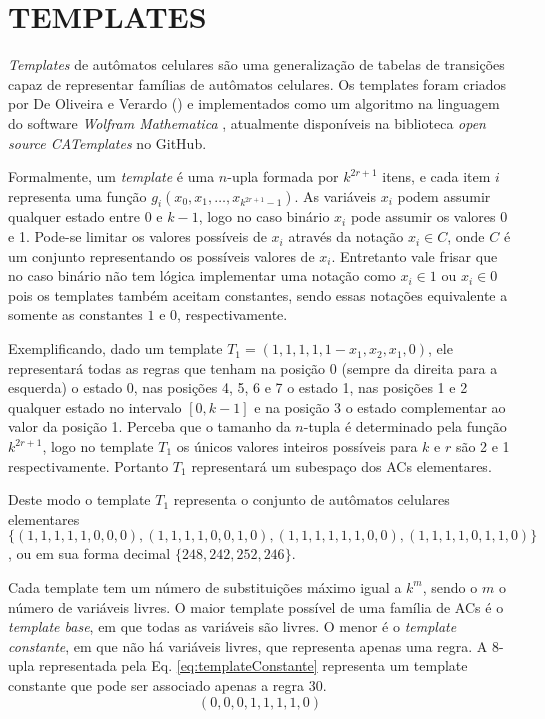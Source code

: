 \section{TEMPLATES}
\label{sec:templates}

\textit{Templates} de autômatos celulares são uma generalização de tabelas de transições capaz de representar famílias de autômatos celulares. Os templates foram criados por De Oliveira e Verardo (\citeyear{deOliveira2014}) e implementados como um algoritmo na linguagem do software \textit{Wolfram Mathematica} \cite{woframMathematica10}, atualmente disponíveis na biblioteca \textit{open source CATemplates} \cite{CATemplates} no GitHub.

Formalmente, um \textit{template} é uma $n$-upla formada por $k^{2r+1}$ itens, e cada item $i$ representa uma função $g_i(x_0,x_1,\dots,x_{k^{2r+1}-1})$. As variáveis $x_i$ podem assumir qualquer estado entre 0 e $k-1$, logo no caso binário $x_i$ pode assumir os valores 0 e 1. Pode-se limitar os valores possíveis de $x_i$ através da notação $x_i \in C$, onde $C$ é um conjunto representando os possíveis valores de $x_i$. Entretanto vale frisar que no caso binário não tem lógica implementar uma notação como $x_i \in {1}$ ou $x_i \in {0}$ pois os templates também aceitam constantes, sendo essas notações equivalente a somente as constantes $1$ e $0$, respectivamente.

Exemplificando, dado um template $T_1 = (1,1,1,1,1-x_1,x_2,x_1,0)$, ele representará todas as regras que tenham na posição 0 (sempre da direita para a esquerda) o estado 0, nas posições 4, 5, 6 e 7 o estado 1, nas posições 1 e 2 qualquer estado no intervalo $[0,k-1]$ e na posição 3 o estado complementar ao valor da posição 1. Perceba que o tamanho da $n$-tupla é determinado pela função $k^{2r+1}$, logo no template $T_1$ os únicos valores inteiros possíveis para $k$ e $r$ são 2 e 1 respectivamente. Portanto $T_1$ representará um subespaço dos ACs elementares.

Deste modo o template $T_1$ representa o conjunto de autômatos celulares elementares $\{(1,1,1,1,1,0,0,0),(1,1,1,1,0,0,1,0),(1,1,1,1,1,1,0,0),(1,1,1,1,0,1,1,0)\}$, ou em sua forma decimal $\{248,242,252,246\}$.

Cada template tem um número de substituições máximo igual a $k^m$, sendo o $m$ o número de variáveis livres. O maior template possível de uma família de ACs é o \textit{template base}, em que todas as variáveis são livres. O menor é o \textit{template constante}, em que não há variáveis livres, que representa apenas uma regra. A $8$-upla representada pela Eq. \eqref{eq:templateConstante} representa um template constante que pode ser associado apenas a regra 30. 
\begin{equation}
(0,0,0,1,1,1,1,0)
\label{eq:templateConstante}
\end{equation}

